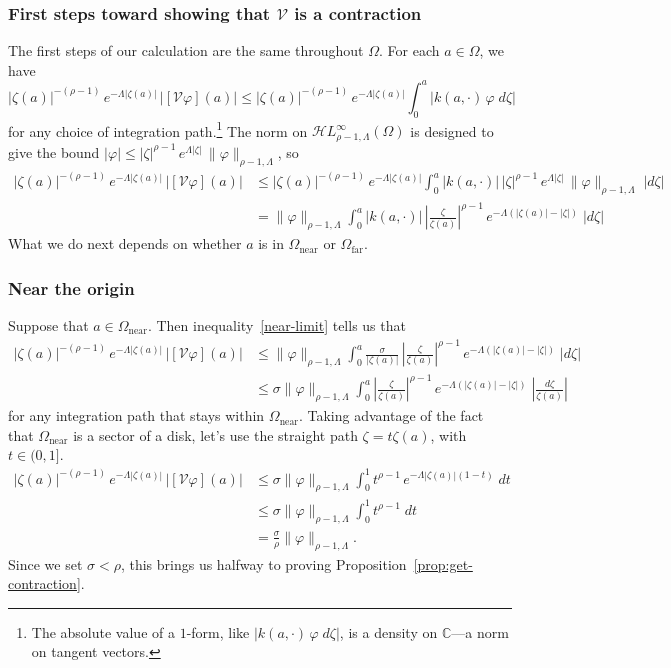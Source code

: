 \documentclass{article}
\theoremstyle{definition}
\theoremstyle{plain}
\newcommand{\C}{\mathbb{C}}
\newcommand{\singexp}[2]{\mathcal{H}L^\infty_{#1, #2}}
\newcommand{\volterra}{\mathcal{V}}
\newcommand{\domain}{\Omega}
\newcommand{\near}{\Omega_\text{near}}
\newcommand{\far}{\Omega_\text{far}}
\begin{document}
\subsubsection{First steps toward showing that $\volterra$ is a contraction}\label{first-steps}
The first steps of our calculation are the same throughout $\domain$. For each $a \in \domain$, we have
\[ |\zeta(a)|^{-(\rho-1)}\,e^{-\Lambda|\zeta(a)|}\,|[\volterra\varphi](a)| \le |\zeta(a)|^{-(\rho-1)}\,e^{-\Lambda|\zeta(a)|}  \int_0^a |k(a, \cdot)\,\varphi\;d\zeta| \]
for any choice of integration path.\footnote{The absolute value of a $1$-form, like $|k(a, \cdot)\,\varphi\;d\zeta|$, is a density on $\C$---a norm on tangent vectors.} The norm on $\singexp{\rho-1}{\Lambda}(\domain)$ is designed to give the bound $|\varphi| \le |\zeta|^{\rho-1}\,e^{\Lambda |\zeta|}\,\|\varphi\|_{\rho-1, \Lambda}$, so
\begin{align*}
|\zeta(a)|^{-(\rho-1)}\,e^{-\Lambda|\zeta(a)|}\,|[\volterra\varphi](a)| & \le |\zeta(a)|^{-(\rho-1)}\,e^{-\Lambda|\zeta(a)|}  \int_0^a |k(a, \cdot)|\,|\zeta|^{\rho-1}\,e^{\Lambda |\zeta|}\,\|\varphi\|_{\rho-1, \Lambda}\;|d\zeta| \\
& = \|\varphi\|_{\rho-1, \Lambda}  \int_0^a |k(a, \cdot)|\,\left|\frac{\zeta}{\zeta(a)}\right|^{\rho-1}\,e^{-\Lambda(|\zeta(a)| - |\zeta|)}\;|d\zeta|
\end{align*}
What we do next depends on whether $a$ is in $\near$ or $\far$.
\subsubsection{Near the origin}\label{near-bound}
Suppose that $a \in \near$. Then inequality~\eqref{near-limit} tells us that
\begin{align*}
|\zeta(a)|^{-(\rho-1)}\,e^{-\Lambda|\zeta(a)|}\,|[\volterra\varphi](a)| & \le
\|\varphi\|_{\rho-1, \Lambda}  \int_0^a \frac{\sigma}{|\zeta(a)|}\,\left|\frac{\zeta}{\zeta(a)}\right|^{\rho-1}\,e^{-\Lambda(|\zeta(a)| - |\zeta|)}\;|d\zeta| \\
& \le \sigma \|\varphi\|_{\rho-1, \Lambda}  \int_0^a \left|\frac{\zeta}{\zeta(a)}\right|^{\rho-1}\,e^{-\Lambda(|\zeta(a)| - |\zeta|)}\;\left|\frac{d\zeta}{\zeta(a)}\right|
\end{align*}
for any integration path that stays within $\near$. Taking advantage of the fact that $\near$ is a sector of a disk, let's use the straight path $\zeta = t \zeta(a)$, with $t \in (0, 1]$.
\begin{align*}
|\zeta(a)|^{-(\rho-1)}\,e^{-\Lambda|\zeta(a)|}\,|[\volterra\varphi](a)| & \le \sigma \|\varphi\|_{\rho-1, \Lambda} \int_0^1 t^{\rho-1}\,e^{-\Lambda |\zeta(a)|(1 - t)}\;dt \\
& \le \sigma \|\varphi\|_{\rho-1, \Lambda} \int_0^1 t^{\rho-1}\;dt \\
& = \frac{\sigma}{\rho} \|\varphi\|_{\rho-1, \Lambda}.
\end{align*}
Since we set $\sigma < \rho$, this brings us halfway to proving Proposition~\ref{prop:get-contraction}.
\end{document}
